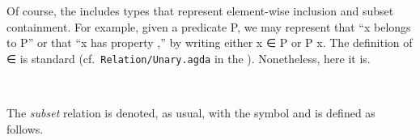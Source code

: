 \documentclass[a4paper,UKenglish,cleveref,autoref,thm-restate,11pt]{lipics-v2021}
\begin{document}

Of course, the \ualib includes types that represent element-wise inclusion and subset containment. For example, given a predicate \af P, we may represent that  ``\ab x belongs to \af P'' or that ``\ab x has property ,'' by writing either \ab x \af ∈ \af P or \af P \ab x.  The definition of \af ∈ is standard (cf.~\texttt{Relation/Unary.agda} in the \agdastdlib). Nonetheless, here it is.
\ccpad
\begin{code}%
\>[1]\AgdaSpace{}%
\AgdaSymbol{:}\AgdaSpace{}%
\AgdaSymbol{\{}\AgdaSpace{}%
\AgdaSymbol{:}\AgdaSpace{}%
%
\AgdaSpace{}%
\AgdaSymbol{\}}\AgdaSpace{}%
\AgdaSpace{}%
\AgdaSpace{}%
\AgdaSpace{}%
\AgdaSpace{}%
\AgdaSpace{}%
\AgdaSpace{}%
\AgdaSpace{}%
%
\<%
\\
%
\>[1]\AgdaSpace{}%
\AgdaSpace{}%
\AgdaSpace{}%
\AgdaSymbol{=}\AgdaSpace{}%
\AgdaSpace{}%
\<%
\end{code}
\ccpad
The \textit{subset} relation is denoted, as usual, with the  symbol and is defined as follows.
\ccpad
\begin{code}%
\>[0]\AgdaSpace{}%
\AgdaSymbol{:}\AgdaSpace{}%
\AgdaSymbol{\{}\AgdaSpace{}%
\AgdaSymbol{:}\AgdaSpace{}%
%
\AgdaSpace{}%
\AgdaSymbol{\}}\AgdaSpace{}%
\AgdaSpace{}%
\AgdaSpace{}%
\AgdaSpace{}%
\AgdaSpace{}%
\AgdaSpace{}%
\AgdaSpace{}%
\AgdaSpace{}%
\AgdaSpace{}%
\AgdaSpace{}%
\AgdaSpace{}%
\AgdaSpace{}%
\AgdaSpace{}%
\AgdaSpace{}%
%
\<%
\\
\>[0]\AgdaSpace{}%
\AgdaSpace{}%
\AgdaSpace{}%
\AgdaSymbol{=}\AgdaSpace{}%
\AgdaSpace{}%
\AgdaSymbol{\{}\AgdaSymbol{\}}\AgdaSpace{}%
\AgdaSpace{}%
\AgdaSpace{}%
\AgdaSpace{}%
\AgdaSpace{}%
\AgdaSpace{}%
\AgdaSpace{}%
\AgdaSpace{}%
\<%
\end{code}
\end{document}
